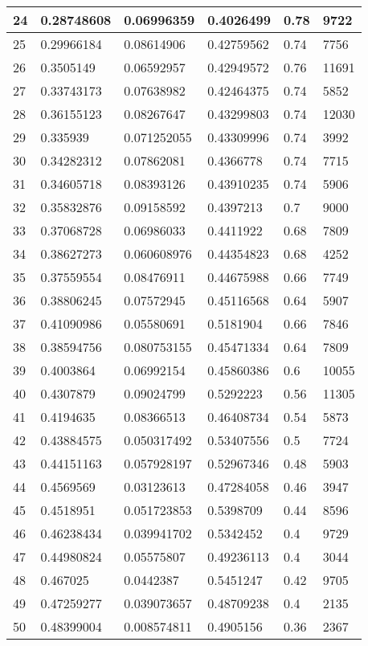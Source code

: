 \begin{longtable}{|l|l|l|l|l|l|}
24 & 0.28748608 & 0.06996359 & 0.4026499 & 0.78 & 9722 \\ \hline 
25 & 0.29966184 & 0.08614906 & 0.42759562 & 0.74 & 7756 \\ \hline 
26 & 0.3505149 & 0.06592957 & 0.42949572 & 0.76 & 11691 \\ \hline 
27 & 0.33743173 & 0.07638982 & 0.42464375 & 0.74 & 5852 \\ \hline 
28 & 0.36155123 & 0.08267647 & 0.43299803 & 0.74 & 12030 \\ \hline 
29 & 0.335939 & 0.071252055 & 0.43309996 & 0.74 & 3992 \\ \hline 
30 & 0.34282312 & 0.07862081 & 0.4366778 & 0.74 & 7715 \\ \hline 
31 & 0.34605718 & 0.08393126 & 0.43910235 & 0.74 & 5906 \\ \hline 
32 & 0.35832876 & 0.09158592 & 0.4397213 & 0.7 & 9000 \\ \hline 
33 & 0.37068728 & 0.06986033 & 0.4411922 & 0.68 & 7809 \\ \hline 
34 & 0.38627273 & 0.060608976 & 0.44354823 & 0.68 & 4252 \\ \hline 
35 & 0.37559554 & 0.08476911 & 0.44675988 & 0.66 & 7749 \\ \hline 
36 & 0.38806245 & 0.07572945 & 0.45116568 & 0.64 & 5907 \\ \hline 
37 & 0.41090986 & 0.05580691 & 0.5181904 & 0.66 & 7846 \\ \hline 
38 & 0.38594756 & 0.080753155 & 0.45471334 & 0.64 & 7809 \\ \hline 
39 & 0.4003864 & 0.06992154 & 0.45860386 & 0.6 & 10055 \\ \hline 
40 & 0.4307879 & 0.09024799 & 0.5292223 & 0.56 & 11305 \\ \hline 
41 & 0.4194635 & 0.08366513 & 0.46408734 & 0.54 & 5873 \\ \hline 
42 & 0.43884575 & 0.050317492 & 0.53407556 & 0.5 & 7724 \\ \hline 
43 & 0.44151163 & 0.057928197 & 0.52967346 & 0.48 & 5903 \\ \hline 
44 & 0.4569569 & 0.03123613 & 0.47284058 & 0.46 & 3947 \\ \hline 
45 & 0.4518951 & 0.051723853 & 0.5398709 & 0.44 & 8596 \\ \hline 
46 & 0.46238434 & 0.039941702 & 0.5342452 & 0.4 & 9729 \\ \hline 
47 & 0.44980824 & 0.05575807 & 0.49236113 & 0.4 & 3044 \\ \hline 
48 & 0.467025 & 0.0442387 & 0.5451247 & 0.42 & 9705 \\ \hline 
49 & 0.47259277 & 0.039073657 & 0.48709238 & 0.4 & 2135 \\ \hline 
50 & 0.48399004 & 0.008574811 & 0.4905156 & 0.36 & 2367 \\ \hline 
\end{longtable}